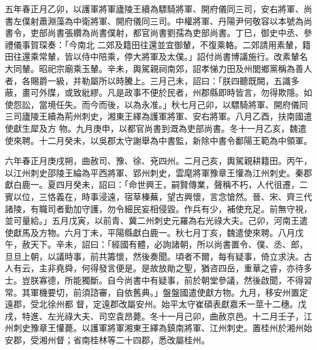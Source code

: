 \begin{pinyinscope}
 五年春正月乙卯，以護軍將軍廬陵王續為驃騎將軍、開府儀同三司，安右將軍、尚書左僕射蕭淵藻為中衛將軍、開府儀同三司。中權將軍、丹陽尹何敬容以本號為尚書令，吏部尚書張纘為尚書僕射，都官尚書劉孺為吏部尚書。丁巳，御史中丞、參禮儀事賀琛奏：「今南北
 二郊及籍田往還並宜御輦，不復乘輅。二郊請用素輦，籍田往還乘常輦，皆以侍中陪乘，停大將軍及太僕。」詔付尚書博議施行。改素輦名大同輦。昭祀宗廟乘玉輦。辛未，輿駕親祠南郊，詔孝悌力田及州閭鄉黨稱為善人者，各賜爵一級，并勒屬所以時騰上。三月己未，詔曰：「朕四聽既闕，五識多蔽，畫可外牒，或致紕繆。凡是政事不便於民者，州郡縣即時皆言，勿得欺隱。如使怨訟，當境任失。而今而後，以為永准。」秋七月己卯，以驃騎將軍、開府儀同三司廬陵王續為荊州刺史，湘東王繹為護軍將軍、安右將軍。八月乙酉，扶南國遣使獻生犀及方
 物。九月庚申，以都官尚書到溉為吏部尚書。冬十一月乙亥，魏遣使來聘。十二月癸未，以吳郡太守謝舉為中書監，新除中書令鄱陽王範為中領軍。



 六年春正月庚戌朔，曲赦司、豫、徐、兗四州。二月己亥，輿駕親耕籍田。丙午，以江州刺史邵陵王綸為平西將軍、郢州刺史，雲麾將軍豫章王懽為江州刺史。秦郡獻白鹿一。夏四月癸未，詔曰：「命世興王，嗣賢傳業，聲稱不朽，人代徂遷，二賓以位，三恪義在，時事浸遠，宿草榛蕪，望古興懷，言念愴然。晉、宋、齊三代諸陵，有職司者勤加守護，勿令細民妄相侵毀。作兵有少，補使充足。前無守視，
 並可量給。」五月戊寅，以前青、冀二州刺史元羅為右光祿大夫。己卯，河南王遣使獻馬及方物。六月丁未，平陽縣獻白鹿一。秋七月丁亥，魏遣使來聘。八月戊午，赦天下。辛未，詔曰：「經國有體，必詢諸朝，所以尚書置令、僕、丞、郎，旦旦上朝，以議時事，前共籌懷，然後奏聞。頃者不爾，每有疑事，倚立求決。古人有云，主非堯舜，何得發言便是。是故放勛之聖，猶咨四岳，重華之睿，亦待多士。豈朕寡德，所能獨斷。自今尚書中有疑事，前於朝堂參議，然後啟聞，不得習常。其軍機要切，前須諮審，自依舊典。」盤盤國遣使獻方物。九月，移安州置定遠郡，受北徐州都
 督，定遠郡改屬安州。始平太守崔碩表獻嘉禾一莖十二穗。戊戌，特進、左光祿大夫、司空袁昂薨。冬十一月己卯，曲赦京邑。十二月壬子，江州刺史豫章王懽薨。以護軍將軍湘東王繹為鎮南將軍、江州刺史。置桂州於湘州始安郡，受湘州督；省南桂林等二十四郡，悉改屬桂州。




\end{pinyinscope}
